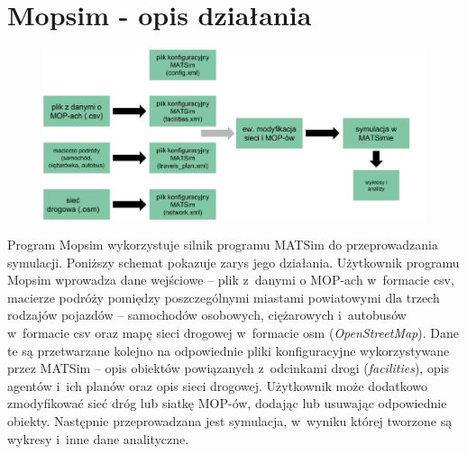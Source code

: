 \section[Opis działania]{Mopsim - opis działania}
    \begin{figure}[h]
        \includegraphics[width=\textwidth]{images/mopsim/mopsim-workflow2.png}
    \end{figure}
Program Mopsim wykorzystuje silnik programu MATSim do przeprowadzania
symulacji. Poniższy schemat pokazuje zarys jego działania. Użytkownik programu
Mopsim wprowadza dane wejściowe -- plik z~danymi o MOP-ach w~formacie csv,
macierze podróży pomiędzy poszczególnymi miastami powiatowymi dla trzech
rodzajów pojazdów -- samochodów osobowych, ciężarowych i~autobusów w~formacie
csv oraz mapę sieci drogowej w~formacie \acrshort{osm}
(\textit{OpenStreetMap}\cite{osm}). Dane te są przetwarzane kolejno na odpowiednie pliki konfiguracyjne wykorzystywane przez MATSim -- opis obiektów powiązanych z~odcinkami drogi (\textit{facilities}), opis agentów i~ich planów oraz opis sieci drogowej. Użytkownik może dodatkowo zmodyfikować sieć dróg lub siatkę MOP-ów, dodając lub usuwając odpowiednie obiekty. Następnie przeprowadzana jest symulacja, w~wyniku której tworzone są wykresy i~inne dane analityczne.

